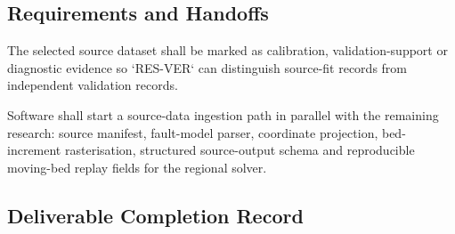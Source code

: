 \subsection{Requirements and Handoffs}
\label{sec:res-dat-src-requirements}


The selected source dataset shall be marked as calibration,
validation-support or diagnostic evidence so `RES-VER` can distinguish
source-fit records from independent validation records.

Software shall start a source-data ingestion path in parallel with the
remaining research: source manifest, fault-model parser, coordinate
projection, bed-increment rasterisation, structured source-output
schema and reproducible moving-bed replay fields for the regional
solver.

\subsection{Deliverable Completion Record}
\label{sec:res-dat-src-completion-record}

%
%
%

